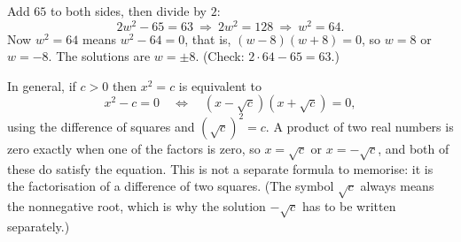 Add $65$ to both sides, then divide by $2$:
\[
2w^2-65=63\ \Longrightarrow\ 2w^2=128\ \Longrightarrow\ w^2=64 .
\]
Now $w^2=64$ means $w^2-64=0$, that is, $(w-8)(w+8)=0$, so $w=8$ or $w=-8$. The solutions are $\boxed{w=\pm8}$. (Check: $2\cdot64-65=63$.)

In general, if $c>0$ then $x^2=c$ is equivalent to
\[
x^2-c=0\quad\Longleftrightarrow\quad (x-\sqrt c)(x+\sqrt c)=0 ,
\]
using the difference of squares and $(\sqrt c)^2=c$. A product of two real numbers is zero exactly when one of the factors is zero, so $x=\sqrt c$ or $x=-\sqrt c$, and both of these do satisfy the equation. This is not a separate formula to memorise: it is the factorisation of a difference of two squares. (The symbol $\sqrt c$ always means the nonnegative root, which is why the solution $-\sqrt c$ has to be written separately.)
